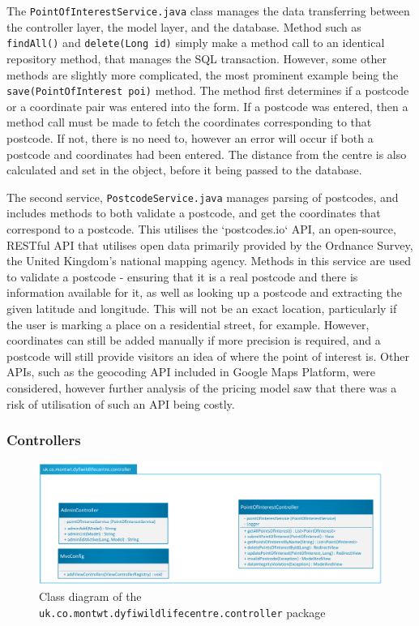 The \texttt{PointOfInterestService.java} class manages the data transferring between the controller layer, the model layer, and the database. Method such as \texttt{findAll()} and \texttt{delete(Long id)} simply make a method call to an identical repository method, that manages the SQL transaction. However, some other methods are slightly more complicated, the most prominent example being the \texttt{save(PointOfInterest poi)} method. The method first determines if a postcode or a coordinate pair was entered into the form. If a postcode was entered, then a method call must be made to fetch the coordinates corresponding to that postcode. If not, there is no need to, however an error will occur if both a postcode and coordinates had been entered. The distance from the centre is also calculated and set in the object, before it being passed to the database.

The second service, \texttt{PostcodeService.java} manages parsing of postcodes, and includes methods to both validate a postcode, and get the coordinates that correspond to a postcode. This utilises the `postcodes.io` API, an open-source, RESTful API that utilises open data primarily provided by the Ordnance Survey, the United Kingdom's national mapping agency\cite{PostcodesAPI}. Methods in this service are used to validate a postcode - ensuring that it is a real postcode and there is information available for it, as well as looking up a postcode and extracting the given latitude and longitude. This will not be an exact location, particularly if the user is marking a place on a residential street, for example. However, coordinates can still be added manually if more precision is required, and a postcode will still provide visitors an idea of where the point of interest is. Other APIs, such as the geocoding API included in Google Maps Platform, were considered, however further analysis of the pricing model saw that there was a risk of utilisation of such an API being costly.

\subsubsection{Controllers}
\begin{figure}[!htbp]
	\includegraphics[scale=0.4]{diagrams/controller}
	\caption{Class diagram of the \texttt{uk.co.montwt.dyfiwildlifecentre.controller} package}
\end{figure}	

